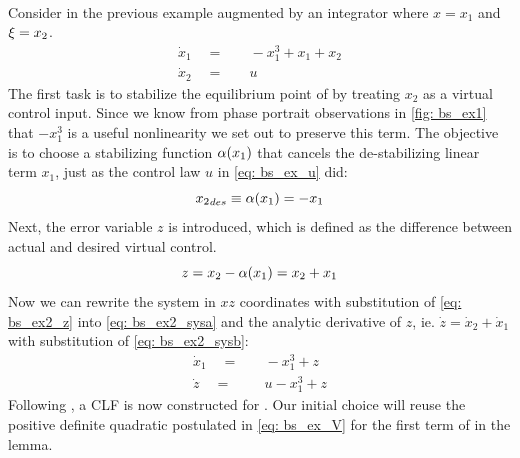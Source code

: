\documentclass[12pt]{ucthesis}
\begin{document}
\begin{eg} \alignright \citet[Ex. 3.1]{Harkegard2003} \label{eg: bs_lyp}\\
	\indent Consider  in the previous example augmented by an integrator where $x = x_1$ and $\xi = x_2$.
		\begin{subequations}%
			\label{eq: bs_ex2_sys}%
			\begin{align}%
				\label{eq: bs_ex2_sysa} \dot{x}_1 \quad =& \quad -x_1^3 + x_1 + x_2 \\
				\label{eq: bs_ex2_sysb} \dot{x}_2 \quad =& \quad u
			\end{align}%
		\end{subequations}%
	\indent The first task is to stabilize the equilibrium point of  by treating $x_2$ as a virtual control input. Since we know from phase portrait observations in \autoref{fig: bs_ex1} that $-x_1^3$ is a useful nonlinearity we set out to preserve this term. The objective is to choose a stabilizing function $\alpha(x_1)$ that cancels the de-stabilizing linear term $x_1$, just as the control law $u$ in \autoref{eq: bs_ex_u} did:
		\begin{equation} \label{eq: bs_ex2_virt}
			{x_2}_{des} \equiv \alpha(x_1) = -x_1
		\end{equation}
	Next, the error variable $z$ is introduced, which is defined as the difference between actual and desired virtual control.
		\begin{equation} \label{eq: bs_ex2_z}
			z = x_2 - \alpha(x_1) = x_2 + x_1
		\end{equation}
	Now we can rewrite the system in $xz$ coordinates with substitution of \ref{eq: bs_ex2_z} into \ref{eq: bs_ex2_sysa} and the analytic derivative of $z$, ie. $\dot{z} = \dot{x}_2 + \dot{x}_1$ with substitution of \ref{eq: bs_ex2_sysb}:
		\begin{subequations} \label{eq: bs_ex2_xz}
			\begin{align}
				\dot{x}_1 \quad =& \quad  -x_1^3 + z \\
				\dot{z} \quad =& \quad  u - x_1^3 + z
			\end{align}
		\end{subequations}
	\indent Following , a CLF is now constructed for . Our initial choice will reuse the positive definite quadratic postulated in \autoref{eq: bs_ex_V} for the first term of  in the lemma.

\end{eg}
\end{document}
